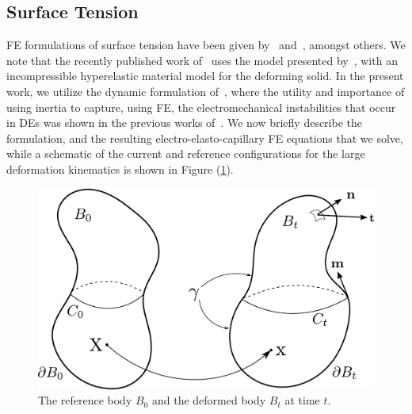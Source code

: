 \documentclass[final,authoryear,3p,times]{elsarticle}
\begin{document}
\subsection{Surface Tension}

FE formulations of surface tension have been given by~\citet{saksonoCM2006} and~\citet{javiliCMAME2010}, amongst others.  We note that the recently published work of~\citet{henannSM2014} uses the model presented by~\citet{saksonoCM2006}, with an incompressible hyperelastic material model for the deforming solid.  In the present work, we utilize the dynamic formulation of~\citet{saksonoCM2006a}, where the utility and importance of using inertia to capture, using FE, the electromechanical instabilities that occur in DEs was shown in the previous works of~\citet{parkIJSS2012,parkCMAME2013,parkSM2013}.  We now briefly describe the formulation, and the resulting electro-elasto-capillary FE equations that we solve, while a schematic of the current and reference configurations for the large deformation kinematics is shown in Figure (\ref{ref}).

\begin{figure} \begin{center}
\includegraphics[scale=0.4]{pics/refdef.pdf}
\caption{The reference body $B_0$ and the deformed body $B_t$ at time $t$.}
\label{ref} \end{center}
\end{figure}
\end{document}

